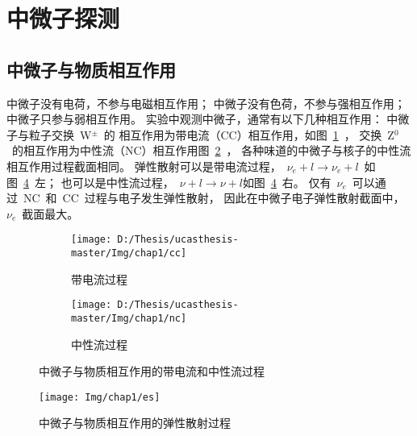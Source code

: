 \section{中微子探测}
\subsection{中微子与物质相互作用}
中微子没有电荷，不参与电磁相互作用；
中微子没有色荷，不参与强相互作用；
中微子只参与弱相互作用。
实验中观测中微子，通常有以下几种相互作用：
中微子与粒子交换~W$^{\pm}$~的
相互作用为带电流（CC）相互作用，如图~\ref{fig:cc}~，
交换~Z$^0$~的相互作用为中性流（NC）相互作用图~\ref{fig:nc}~，
各种味道的中微子与核子的中性流相互作用过程截面相同。
弹性散射可以是带电流过程，~$\nu_e+l \rightarrow \nu_e+l $~如图~\ref{fig:es}~左；
也可以是中性流过程，~$\nu+l \rightarrow \nu+l$如图~\ref{fig:es}~右。
仅有~$\nu_e$~可以通过~NC~和~CC~过程与电子发生弹性散射，
因此在中微子电子弹性散射截面中，~$\nu_e$~截面最大。
\begin{figure}[!htb]
  \centering
  \begin{subfigure}[b]{\MySubFactor\textwidth}
    \texttt{[image: D:/Thesis/ucasthesis-master/Img/chap1/cc]}
    \caption{带电流过程}
    \label{fig:cc}
  \end{subfigure}%
  \begin{subfigure}[b]{\MySubFactor\textwidth}
    \texttt{[image: D:/Thesis/ucasthesis-master/Img/chap1/nc]}
    \caption{中性流过程}
    \label{fig:nc}
  \end{subfigure}
  \caption{中微子与物质相互作用的带电流和中性流过程}
  \label{fig:ccnc}
\end{figure}


\begin{figure}[!htb]
  \centering
   \texttt{[image: Img/chap1/es]}
    \caption{ 中微子与物质相互作用的弹性散射过程}
  \label{fig:es}
\end{figure}

